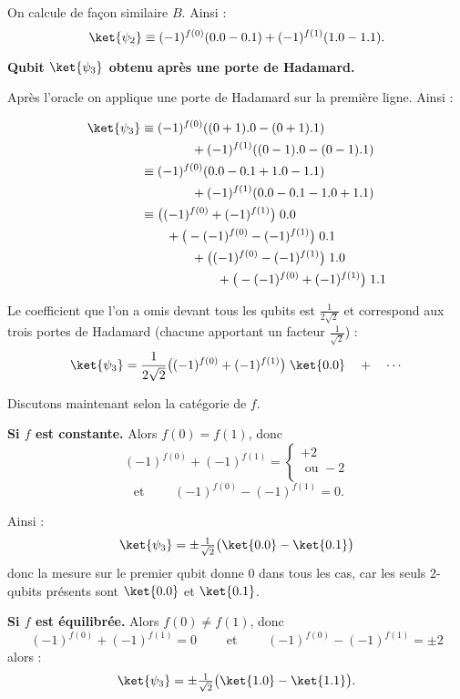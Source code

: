 \documentclass[11pt,class=report,crop=false]{standalone}
\begin{document}
On calcule de façon similaire $B$. Ainsi :
$$\ket{\psi_2} \equiv (-1)^{f(0)} (0.0 - 0.1) + (-1)^{f(1)} (1.0 - 1.1).$$

\textbf{Qubit $\ket{\psi_3}$ obtenu après une porte de Hadamard.}

Après l'oracle on applique une porte de Hadamard sur la première ligne. 
Ainsi :

\begin{align*}
\ket{\psi_3} 
 &\equiv (-1)^{f(0)} ((0+1).0 - (0+1).1) \\
   & \qquad \qquad + (-1)^{f(1)} ((0-1).0 - (0-1).1) \\
 &\equiv (-1)^{f(0)} (0.0 - 0.1 + 1.0 - 1.1)  \\  
   & \qquad \qquad + (-1)^{f(1)} (0.0 - 0.1 - 1.0 + 1.1) \\
 &\equiv \big((-1)^{f(0)} + (-1)^{f(1)}\big) \; 0.0  \\  
   & \qquad +\big(-(-1)^{f(0)} - (-1)^{f(1)}\big) \; 0.1 \\
   & \qquad \qquad +\big((-1)^{f(0)} - (-1)^{f(1)}\big) \; 1.0 \\   
   & \qquad \qquad \qquad +\big(-(-1)^{f(0)} + (-1)^{f(1)}\big) \; 1.1 \\
\end{align*}

Le coefficient que l'on a omis devant tous les qubits est $\frac{1}{2\sqrt2}$ et correspond aux trois portes de Hadamard (chacune apportant un facteur $\frac{1}{\sqrt2}$) :
$$\ket{\psi_3} = \frac{1}{2\sqrt2}\big((-1)^{f(0)} + (-1)^{f(1)}\big) \; \ket{0.0} \quad + \quad \cdots
$$

Discutons maintenant selon la catégorie de $f$.

\textbf{Si $f$ est constante.}
Alors $f(0)=f(1)$, donc 
$$(-1)^{f(0)} + (-1)^{f(1)} = \left\{ 
\begin{array}{l}
+2 \\
\text{ ou } -2  \\
\end{array}\right.$$
$$\text{ et } \qquad (-1)^{f(0)} - (-1)^{f(1)} = 0.$$

Ainsi :
$$\ket{\psi_3} = \pm\tfrac{1}{\sqrt2} \big( \ket{0.0} - \ket{0.1} \big)$$
donc la mesure sur le premier qubit donne $0$ dans tous les cas, car les seuls $2$-qubits présents sont $\ket{0.0}$ et $\ket{0.1}$.

\textbf{Si $f$ est équilibrée.}
Alors $f(0)\neq f(1)$, donc 
$$(-1)^{f(0)} + (-1)^{f(1)}= 0 \qquad \text{ et }\qquad (-1)^{f(0)} - (-1)^{f(1)} = \pm2$$
alors :
$$\ket{\psi_3} = \pm\tfrac{1}{\sqrt2} \big( \ket{1.0} - \ket{1.1} \big).$$
\end{document}
